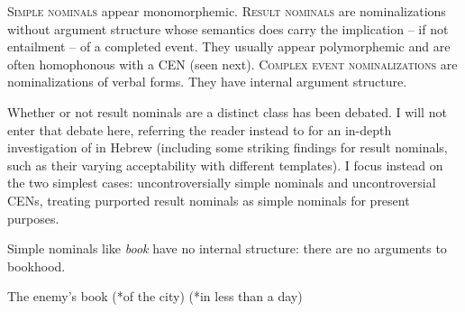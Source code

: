 \begin{exe}
\begin{xlist}
\begin{exe}
\begin{xlist}
\begin{exe}
\begin{exe}
\begin{xlist}
\begin{exe}
\begin{exe}
\begin{xlist}
\begin{exe}
\begin{xlist}
\begin{exe}
\begin{xlist}
\begin{exe}
\begin{xlist}
\begin{exe}
\begin{xlist}
\begin{xlist}
\begin{exe}
\begin{xlist}
\begin{exe}
\begin{xlist}
\begin{exe}
\begin{exe}
\begin{exe}
\begin{xlist}
\begin{exe}
\begin{exe}
\begin{xlist}
\begin{exe}
\begin{xlist}
\begin{exe}
\begin{xlist}
\begin{exe}
\begin{xlist}
\begin{xlist}
\begin{exe}
\begin{xlist}
\begin{exe}
\begin{xlist}
\begin{exe}
\begin{xlist}
\begin{exe}
\begin{xlist}
\begin{exe}
\begin{exe}
\begin{exe}
\begin{exe}
\begin{exe}
\begin{xlist}
\begin{xlist}
\begin{exe}
\begin{xlist}
\begin{exe}
\begin{xlist}
\begin{exe}
\begin{exe}
\begin{exe}
\begin{xlist}
\begin{exe}
\begin{xlist}
\begin{exe}
\begin{xlist}
\begin{exe}
 \begin{exe}
 \ex  \label{ex:5n53}
 \begin{xlist} 
 	\ex  \textsc{Simple nominals} appear monomorphemic. 
 	\ex  \textsc{Result nominals} are nominalizations without argument structure whose semantics does carry the implication -- if not entailment -- of a completed event. They usually appear polymorphemic and are often homophonous with a CEN (seen next). 
 	\ex  \textsc{Complex event nominalizations} are nominalizations of verbal forms. They have internal argument structure. 
 \z
\z 

Whether or not result nominals are a distinct class has been debated. I will not enter that debate here, referring the reader instead to \cite{ahdout19glow,ahdout19phd} for an in-depth investigation of  in Hebrew (including some striking findings for result nominals, such as their varying acceptability with different templates). I focus instead on the two simplest cases: uncontroversially simple nominals and uncontroversial CENs, treating purported result nominals as simple nominals for present purposes.

Simple nominals like \emph{book }have no internal structure: there are no arguments to bookhood.
 \begin{exe}
\ex  The enemy's book (*of the city) (*in less than a day) 
 \z 	


\end{exe}
\end{xlist}
\end{exe}
\end{exe}
\end{xlist}
\end{exe}
\end{xlist}
\end{exe}
\end{xlist}
\end{exe}
\end{exe}
\end{exe}
\end{xlist}
\end{exe}
\end{xlist}
\end{exe}
\end{xlist}
\end{xlist}
\end{exe}
\end{exe}
\end{exe}
\end{exe}
\end{exe}
\end{xlist}
\end{exe}
\end{xlist}
\end{exe}
\end{xlist}
\end{exe}
\end{xlist}
\end{exe}
\end{xlist}
\end{xlist}
\end{exe}
\end{xlist}
\end{exe}
\end{xlist}
\end{exe}
\end{xlist}
\end{exe}
\end{exe}
\end{xlist}
\end{exe}
\end{exe}
\end{exe}
\end{xlist}
\end{exe}
\end{xlist}
\end{exe}
\end{xlist}
\end{xlist}
\end{exe}
\end{xlist}
\end{exe}
\end{xlist}
\end{exe}
\end{xlist}
\end{exe}
\end{xlist}
\end{exe}
\end{exe}
\end{xlist}
\end{exe}
\end{exe}
\end{xlist}
\end{exe}
\end{xlist}
\end{exe}
